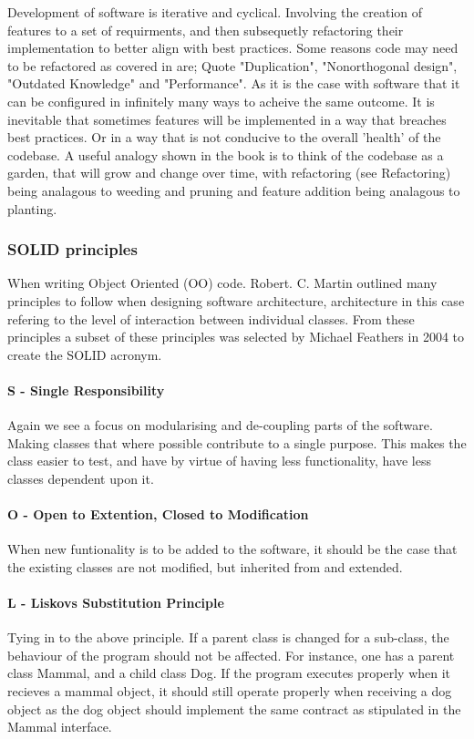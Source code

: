     \par
    Development of software is iterative and cyclical. Involving the creation of features to a set of requirments, and then subsequetly refactoring their implementation to better align with best practices. Some reasons code may need to be refactored as covered in \citep{hunt2000pragmatic} are; Quote "Duplication", "Nonorthogonal design", "Outdated Knowledge" and "Performance". As it is the case with software that it can be configured in infinitely many ways to acheive the same outcome. It is inevitable that sometimes features will be implemented in a way that breaches best practices. Or in a way that is not conducive to the overall 'health' of the codebase. A useful analogy shown in the book is to think of the codebase as a garden, that will grow and change over time, with refactoring (see Refactoring) being analagous to weeding and pruning and feature addition being analagous to planting.
    \subsubsection{SOLID principles}
      When writing Object Oriented (OO) code. Robert. C. Martin outlined many principles to follow when designing software architecture, architecture in this case refering to the level of interaction between individual classes. From these principles a subset of these principles was selected by Michael Feathers in 2004 to create the SOLID acronym.
      \paragraph{S - Single Responsibility}
        Again we see a focus on modularising and de-coupling parts of the software. Making classes that where possible contribute to a single purpose. This makes the class easier to test, and have by virtue of having less functionality, have less classes dependent upon it.
      \paragraph{O - Open to Extention, Closed to Modification}
        When new funtionality is to be added to the software, it should be the case that the existing classes are not modified, but inherited from and extended.
      \paragraph{L - Liskovs Substitution Principle}
        Tying in to the above principle. If a parent class is changed for a sub-class, the behaviour of the program should not be affected. For instance, one has a parent class Mammal, and a child class Dog. If the program executes properly when it recieves a mammal object, it should still operate properly when receiving a dog object as the dog object should implement the same contract as stipulated in the Mammal interface.
